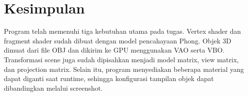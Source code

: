 \documentclass[12pt,a4paper]{article}
\begin{document}
\section{Kesimpulan}

Program telah memenuhi tiga kebutuhan utama pada tugas. Vertex shader dan
fragment shader sudah dibuat dengan model pencahayaan Phong. Objek 3D dimuat
dari file OBJ dan dikirim ke GPU menggunakan VAO serta VBO. Transformasi scene
juga sudah dipisahkan menjadi model matrix, view matrix, dan projection matrix.
Selain itu, program menyediakan beberapa material yang dapat diganti saat
runtime, sehingga konfigurasi tampilan objek dapat dibandingkan melalui
screenshot.
\end{document}
